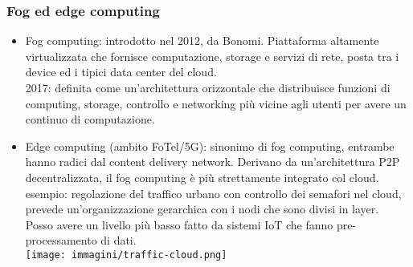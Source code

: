 \documentclass[16px]{article}
\begin{document}
\subsubsection{Fog ed edge computing}
\begin{itemize}
\item Fog computing: introdotto nel 2012, da Bonomi. Piattaforma altamente virtualizzata che fornisce computazione, storage e servizi di rete, posta tra i device ed i tipici data center del cloud.\\2017: definita come un'architettura orizzontale che distribuisce funzioni di computing, storage, controllo e networking più vicine agli utenti per avere un continuo di computazione.
\item Edge computing (ambito FoTel/5G): sinonimo di fog computing, entrambe hanno radici dal content delivery network. Derivano da un'architettura P2P decentralizzata, il fog computing è più strettamente integrato col cloud.
esempio: regolazione del traffico urbano con controllo dei semafori nel cloud, prevede un'organizzazione gerarchica con i nodi che sono divisi in layer.\\ Posso avere un livello più basso fatto da sistemi IoT che fanno pre-processamento di dati.\\
\texttt{[image: immagini/traffic-cloud.png]}
\end{itemize}
\end{document}
